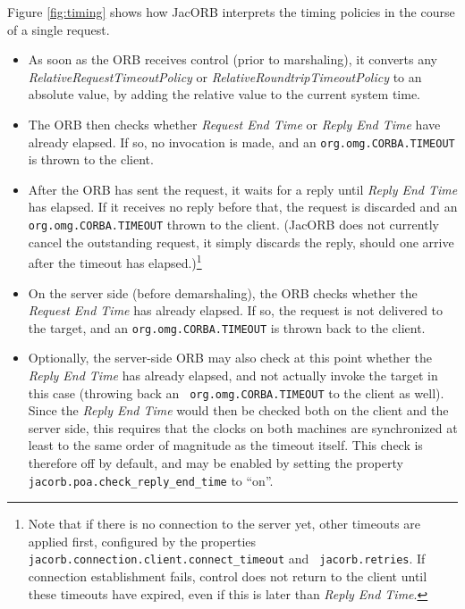 Figure \ref{fig:timing} shows how JacORB interprets the timing
policies in the course of a single request.

\begin{itemize}
\item As soon as the ORB receives control (prior to marshaling), it
converts any \emph{RelativeRequestTimeoutPolicy} or
\emph{RelativeRoundtripTimeoutPolicy} to an absolute value, by adding
the relative value to the current system time.

\item The ORB then checks whether \emph{Request End Time} or
\emph{Reply End Time} have already elapsed.  If so, no invocation is
made, and an {\tt org.omg.CORBA.TIMEOUT} is thrown to the client.

\item After the ORB has sent the request, it waits for a reply until
\emph{Reply End Time} has elapsed.  If it receives no reply before
that, the request is discarded and an {\tt org.omg.CORBA.TIMEOUT}
thrown to the client.  (JacORB does not currently cancel the
outstanding request, it simply discards the reply, should one arrive
after the timeout has elapsed.)\footnote{Note that if there is no
  connection to the server yet, other timeouts are applied first,
configured by the properties {\tt
  jacorb.connection.client.connect\_timeout} and {\tt
  jacorb.retries}.  If connection establishment fails, control does
not return to the client until these timeouts have expired, even if
this is later than \emph{Reply End Time}.}

\item On the server side (before demarshaling), the ORB checks whether
the \emph{Request End Time} has already elapsed.  If so, the request
is not delivered to the target, and an {\tt org.omg.CORBA.TIMEOUT}
is thrown back to the client.

\item Optionally, the server-side ORB may also check at this point
whether the \emph{Reply End Time} has already elapsed, and not
actually invoke the target in this case (throwing back an {\tt
org.omg.CORBA.TIMEOUT} to the client as well).  Since the \emph{Reply
  End Time} would then be checked both on the client and the server
side, this requires that the clocks on both machines are synchronized
at least to the same order of magnitude as the timeout itself.  This
check is therefore off by default, and may be enabled by setting the
property {\tt jacorb.poa.check\_reply\_end\_time} to ``on''.


\end{itemize}
